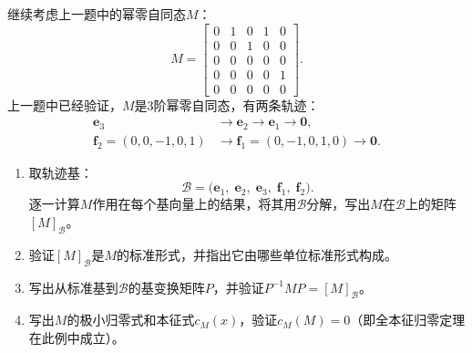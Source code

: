 \documentclass[12pt,UTF8,fontset=none]{ctexbook}
\begin{document}
\begin{et}\label{et:6_canonical}
继续考虑上一题中的幂零自同态$M$：
$$
M = \begin{bmatrix}
0 & 1 & 0 & 1 & 0 \\
0 & 0 & 1 & 0 & 0 \\
0 & 0 & 0 & 0 & 0 \\
0 & 0 & 0 & 0 & 1 \\
0 & 0 & 0 & 0 & 0
\end{bmatrix}.
$$
上一题中已经验证，$M$是$3$阶幂零自同态，有两条轨迹：
\begin{align*}
    \mathbf{e}_3 &\longrightarrow \mathbf{e}_2 \longrightarrow \mathbf{e}_1 \longrightarrow \mathbf{0},\\
    \mathbf{f}_2 = (0,0,-1,0,1) &\longrightarrow \mathbf{f}_1 = (0,-1,0,1,0) \longrightarrow \mathbf{0}.
\end{align*}
\begin{enumerate}
\item 取轨迹基：
$$\mathcal{B} = \big(\mathbf{e}_1,\; \mathbf{e}_2,\; \mathbf{e}_3,\; \mathbf{f}_1,\; \mathbf{f}_2\big).$$
逐一计算$M$作用在每个基向量上的结果，将其用$\mathcal{B}$分解，写出$M$在$\mathcal{B}$上的矩阵$[M]_{\mathcal{B}}$。
\item 验证$[M]_{\mathcal{B}}$是$M$的标准形式，并指出它由哪些单位标准形式构成。
\item 写出从标准基到$\mathcal{B}$的基变换矩阵$P$，并验证$P^{-1}MP = [M]_{\mathcal{B}}$。
\item 写出$M$的极小归零式和本征式$c_M(x)$，验证$c_M(M) = 0$（即全本征归零定理在此例中成立）。
\end{enumerate}
\end{et}
\end{document}
